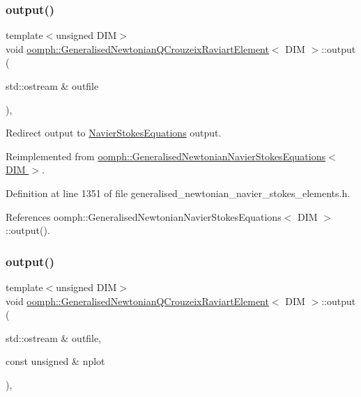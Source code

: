 \subsubsection{\texorpdfstring{output()}{output()}\hspace{0.1cm}{\footnotesize\ttfamily [1/4]}}
{\footnotesize\ttfamily template$<$unsigned D\+IM$>$ \\
void \hyperlink{classoomph_1_1GeneralisedNewtonianQCrouzeixRaviartElement}{oomph\+::\+Generalised\+Newtonian\+Q\+Crouzeix\+Raviart\+Element}$<$ D\+IM $>$\+::output (\begin{DoxyParamCaption}\item[{std\+::ostream \&}]{outfile }\end{DoxyParamCaption})\hspace{0.3cm}{\ttfamily [inline]}, {\ttfamily [virtual]}}



Redirect output to \hyperlink{classoomph_1_1NavierStokesEquations}{Navier\+Stokes\+Equations} output. 



Reimplemented from \hyperlink{classoomph_1_1GeneralisedNewtonianNavierStokesEquations_a1f84ecb8a91df11868349a1e826074bd}{oomph\+::\+Generalised\+Newtonian\+Navier\+Stokes\+Equations$<$ D\+I\+M $>$}.



Definition at line 1351 of file generalised\+\_\+newtonian\+\_\+navier\+\_\+stokes\+\_\+elements.\+h.



References oomph\+::\+Generalised\+Newtonian\+Navier\+Stokes\+Equations$<$ D\+I\+M $>$\+::output().

\mbox{\label{classoomph_1_1GeneralisedNewtonianQCrouzeixRaviartElement_a8479877ac6783559f319414c38245543}} 
\subsubsection{\texorpdfstring{output()}{output()}\hspace{0.1cm}{\footnotesize\ttfamily [2/4]}}
{\footnotesize\ttfamily template$<$unsigned D\+IM$>$ \\
void \hyperlink{classoomph_1_1GeneralisedNewtonianQCrouzeixRaviartElement}{oomph\+::\+Generalised\+Newtonian\+Q\+Crouzeix\+Raviart\+Element}$<$ D\+IM $>$\+::output (\begin{DoxyParamCaption}\item[{std\+::ostream \&}]{outfile,  }\item[{const unsigned \&}]{nplot }\end{DoxyParamCaption})\hspace{0.3cm}{\ttfamily [inline]}, {\ttfamily [virtual]}}




